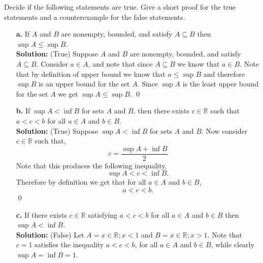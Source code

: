 \documentclass[12pt]{article}
\makeatletter
\theoremstyle{homework}
\newenvironment{exercise}[1]
{\def\@currentlabel{#1}\exercisecore}
{\endexercisecore}
\newcommand{\Reals}{\ensuremath{\mathbb R}}
\let\RR\Reals
\makeatother
\begin{document}
\begin{exercise}{1.3.11}
Decide if the following statements are true.  Give a short proof
for the true statements and a counterexample for the false statements.
\begin{enumerate}
\item[\textbf{a.}] If $A$ and $B$ are nonempty, bounded, and satisfy $A\subseteq B$
then $\sup A\le \sup B$.\\

\textbf{Solution:} (True) Suppose  $A$ and $B$ are nonempty, bounded, and satisfy $A\subseteq B$. Consider $a \in A$, and 
note that since  $A\subseteq B$ we know that $a \in B$. Note that by definition of upper bound we know that $a \le \sup B$
and therefore $\sup B$ is an upper bound for the set $A$. Since $\sup A$ is the least upper bound for the set $A$ we get $\sup A\le \sup B$.
\qed
\vspace{.5in}


\item[\textbf{b.}] If $\sup A< \inf B$ for sets $A$ and $B$, then there exists
$c\in\Reals$ such that $a<c<b$ for all $a\in A$ and $b\in B$.\\

\textbf{Solution:} (True) Suppose $\sup A < \inf B$ for sets $A$ and $B$. Now consider $c \in \RR$ such
that,
\begin{equation*}
  c = \frac{\sup A + \inf B}{2}
\end{equation*}
Note that this produces the following inequality,
\begin{equation*}
  \sup A < c < \inf B.
\end{equation*}
Therefore by definition we get that for all $a\in A$ and $b\in B$,
\begin{equation*}
  a<c<b.
\end{equation*}
\qed
\vspace{.5in}






\item [\textbf{c.}] If there exists $c\in\Reals$ satisfying $a<c<b$ for all
$a\in A$ and $b\in B$ then $\sup A< \inf B$. \\

\textbf{Solution:} (False) Let $A = {x \in \RR; x < 1}$ and $ B = {x \in \RR; x > 1}$. Note that $c = 1$ satisfies the inequality
$a<c<b$, for all $a \in A$ and $b \in B$, while clearly $\sup A = \inf B = 1$.
\end{enumerate}
\end{exercise}
\vspace{1in}
\end{document}
